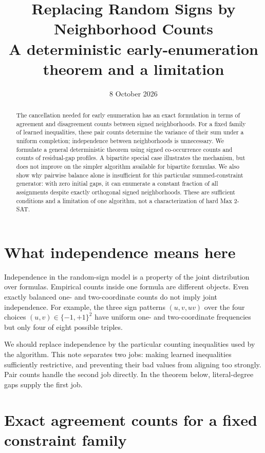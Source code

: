\documentclass[11pt,a4paper]{article}
\title{Replacing Random Signs by Neighborhood Counts\\
\large A deterministic early-enumeration theorem and a limitation}
\author{}
\date{8 October 2026}
\begin{document}
\maketitle

\begin{abstract}
The cancellation needed for early enumeration has an exact formulation
in terms of agreement and disagreement counts between signed
neighborhoods. For a fixed family of learned inequalities, these pair
counts determine the variance of their sum under a uniform completion;
independence between neighborhoods is unnecessary. We formulate a general
deterministic theorem using signed co-occurrence counts and counts of
residual-gap profiles. A bipartite special case illustrates the mechanism,
but does not improve on the simpler algorithm available for bipartite
formulas. We also show why pairwise balance alone is insufficient
for this particular summed-constraint generator: with zero initial gaps,
it can enumerate a constant fraction of all assignments despite exactly
orthogonal signed neighborhoods. These are sufficient conditions and a
limitation of one algorithm, not a characterization of hard Max 2-SAT.
\end{abstract}

\section{What independence means here}

Independence in the random-sign model is a property of the joint
distribution over formulas. Empirical counts inside one formula are
different objects. Even exactly balanced one- and two-coordinate counts
do not imply joint independence. For example, the three sign patterns
$(u,v,uv)$ over the four choices $(u,v)\in\{-1,+1\}^2$ have uniform
one- and two-coordinate frequencies but only four of eight possible
triples.

We should replace independence by the particular counting inequalities
used by the algorithm. This note separates two jobs: making learned
inequalities sufficiently restrictive, and preventing their bad values
from aligning too strongly. Pair counts handle the second job directly.
In the theorem below, literal-degree gaps supply the first job.

\section{Exact agreement counts for a fixed constraint family}
\end{document}
